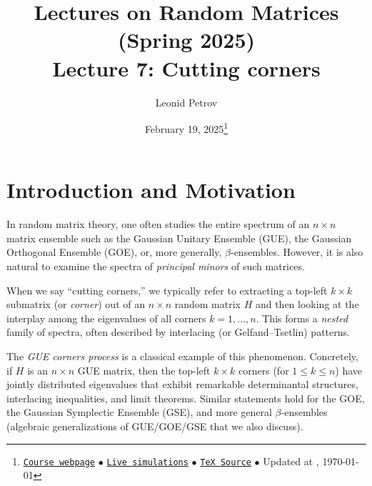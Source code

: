 \documentclass[letterpaper,11pt,oneside,reqno]{article}
\numberwithin{equation}{section}
\theoremstyle{definition}
\begin{document}
\title{Lectures on Random Matrices
(Spring 2025)
\\Lecture 7: Cutting corners}


\date{February 19, 2025\footnote{\href{https://lpetrov.cc/rmt25/}{\texttt{Course webpage}}
$\bullet$ \href{https://lpetrov.cc/simulations/model/random-matrices/}{\texttt{Live simulations}}
$\bullet$ \href{https://lpetrov.cc/rmt25/rmt25-notes/rmt2025-l07.tex}{\texttt{TeX Source}}
$\bullet$
Updated at \currenttime, \today}}



\author{Leonid Petrov}


\maketitle
\tableofcontents

\section{Introduction and Motivation}


In random matrix theory, one often studies the entire spectrum of an $n\times n$ matrix ensemble such as the Gaussian Unitary Ensemble (GUE), the Gaussian Orthogonal Ensemble (GOE), or, more generally, $\beta$-ensembles. However, it is also natural to examine the spectra of \emph{principal minors} of such matrices. 

When we say ``cutting corners,'' we typically refer to extracting a top-left $k\times k$ submatrix (or \emph{corner}) out of an $n\times n$ random matrix $H$ and then looking at the interplay among the eigenvalues of all corners $k=1,\dots,n$. This forms a \emph{nested} family of spectra, often described by interlacing (or Gelfand--Tsetlin) patterns.

The \emph{GUE corners process} is a classical example of this phenomenon. Concretely, if $H$ is an $n\times n$ GUE matrix, then the top-left $k\times k$ corners (for $1\le k\le n$) have jointly distributed eigenvalues that exhibit remarkable determinantal structures, interlacing inequalities, and limit theorems. Similar statements hold for the GOE, the Gaussian Symplectic Ensemble (GSE), and more general $\beta$-ensembles (algebraic generalizations of GUE/GOE/GSE that we also discuss).
\end{document}
